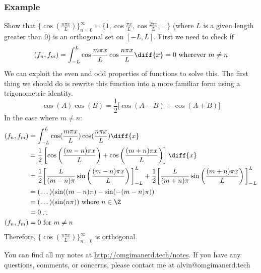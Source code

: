 \documentclass{math}
\begin{document}
\subsubsection*{Example}
Show that \( \{\cos(\frac{n\pi x}{L})\}_{n=0}^{\infty} = \{1,
\cos\frac{\pi x}{L},\cos\frac{2\pi x}{L},\dots\} \) (where \( L \) is a given
length greater than 0) is an orthogonal set on \( [-L,L] \). First we need to
check if
\[ (f_n,f_m) = \int_{-L}^{L}\cos\frac{m\pi x}{L}\cos\frac{n\pi x}{L}\diff{x} =
  0 \text{ wherever } m\ne n \]
We can exploit the even and odd properties of functions to solve this. The first
thing we should do is rewrite this function into a more familiar form using a
trigonometric identity.
\[ \cos(A)\cos(B) = \frac{1}{2}\bigg[\cos(A-B)+\cos(A+B)\bigg] \]
In the case where \( m\ne n \):
\begin{align*}
  (f_n,f_m) &= \int_{-L}^{L}\cos(\frac{m\pi x}{L})
    \cos(\frac{n\pi x}{L})\diff{x} \\
  &= \frac{1}{2}\left[\cos\left(\frac{(m-n)\pi x}{L}\right)+
    \cos\left(\frac{(m+n)\pi x}{L}\right)\right]\diff{x} \\
  &= \frac{1}{2}\bigg[\frac{L}{(m-n)\pi}
    \sin\left(\frac{(m-n)\pi x}{L}\right)\bigg]_{-L}^{L}+
    \frac{1}{2}\bigg[\frac{L}{(m+n)\pi}
    \sin\left(\frac{(m+n)\pi x}{L}\right)\bigg]_{-L}^{L} \\
  &= (\dots)(\sin((m-n)\pi)-\sin(-(m-n)\pi)) \\
  &= (\dots)(\sin(n\pi)) \text{ where } n\in\Z \\
  &= 0 \therefore \\
  (f_n,f_m) &= 0 \text{ for } m\ne n
\end{align*}
Therefore, \( \{\cos(\frac{n\pi x}{L})\}_{n=0}^{\infty} \) is orthogonal.

\begin{center}
  You can find all my notes at \url{http://omgimanerd.tech/notes}. If you have
  any questions, comments, or concerns, please contact me at
  alvin@omgimanerd.tech
\end{center}
\end{document}
